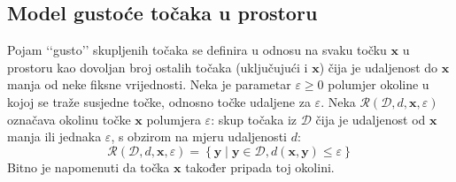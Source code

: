 \documentclass[times, utf8, zavrsni]{fer}
\begin{document}
\subsection{Model gustoće točaka u prostoru}
Pojam ‘‘gusto’’ skupljenih točaka se definira u odnosu na svaku točku $\mathbf{x}$ u prostoru kao dovoljan broj ostalih točaka (uključujući i $\mathbf{x}$) čija je udaljenost do $\mathbf{x}$ manja od neke fiksne vrijednosti. Neka je parametar $\varepsilon \geq 0$ polumjer okoline u kojoj se traže susjedne točke, odnosno točke udaljene za $\varepsilon$. Neka $\mathcal{R} \left(\mathcal{D}, d, \mathbf{x}, \varepsilon\right)$ označava okolinu točke $\mathbf{x}$ polumjera $\varepsilon$: skup točaka iz $\mathcal{D}$ čija je udaljenost od $\mathbf{x}$ manja ili jednaka $\varepsilon$, s obzirom na mjeru udaljenosti $d$:
\[\mathcal{R} \left(\mathcal{D}, d, \mathbf{x}, \varepsilon\right) = \left\{
    \mathbf{y}
    \mid
    \mathbf{y} \in \mathcal{D},
    d \left(\mathbf{x}, \mathbf{y}\right) \leq \varepsilon
\right\}\]
Bitno je napomenuti da točka $\mathbf{x}$ također pripada toj okolini.
\end{document}
